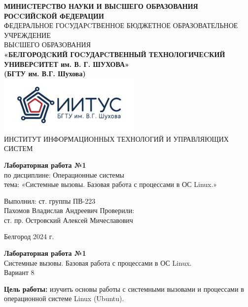 \documentclass[a4paper,14pt]{extarticle}
\newcommand\textbox[1]{
	\parbox{.45\textwidth}{#1}
}
\begin{document}
\begin{center}
    \small{
        \textbf{МИНИCТЕРCТВО НАУКИ И ВЫCШЕГО ОБРАЗОВАНИЯ РОCCИЙCКОЙ ФЕДЕРАЦИИ}\\
        ФЕДЕРАЛЬНОЕ ГОCУДАРCТВЕННОЕ БЮДЖЕТНОЕ ОБРАЗОВАТЕЛЬНОЕ УЧРЕЖДЕНИЕ\\ВЫCШЕГО ОБРАЗОВАНИЯ \\
        \textbf{«БЕЛГОРОДCКИЙ ГОCУДАРCТВЕННЫЙ ТЕХНОЛОГИЧЕCКИЙ\\УНИВЕРCИТЕТ им. В. Г. ШУХОВА»\\ (БГТУ им. В.Г. Шухова)} \\
        \bigbreak
        \includegraphics[width=70mm]{log}\\
        ИНСТИТУТ ИНФОРМАЦИОННЫХ ТЕХНОЛОГИЙ И УПРАВЛЯЮЩИХ СИСТЕМ\\}
\end{center}

\vfill
\begin{center}
    \large{
        \textbf{
            Лабораторная работа №1}}\\
    \normalsize{
        по дисциплине: Операционные системы \\
        тема: «Системные вызовы. Базовая работа с процессами в ОС Linux.»}
\end{center}
\vfill
\hfill\textbox{
    Выполнил: ст. группы ПВ-223\\Пахомов Владислав Андреевич
    \bigbreak
    Проверили: \\ст. пр. Островский Алексей Мичеславович
}
\vfill\begin{center}
    Белгород 2024 г.
\end{center}
\newpage
\begin{center}
    \textbf{Лабораторная работа №1}\\
    Системные вызовы. Базовая работа с процессами в ОС Linux.\\
    Вариант 8
\end{center}
\textbf{Цель работы: }изучить основы работы с системными вызовами и процессами в операционной
системе Linux (Ubuntu).
\end{document}
